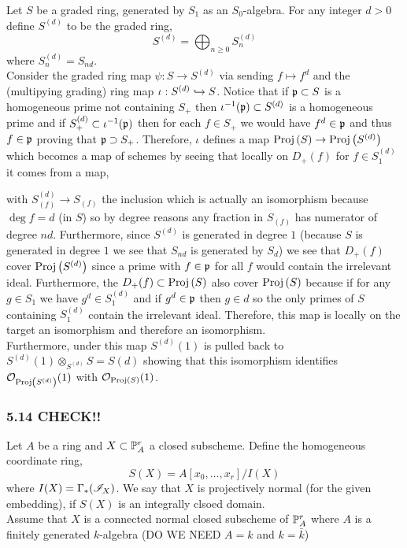 \documentclass[12pt]{article}
\begin{document}
Let $S$ be a graded ring, generated by $S_1$ as an $S_0$-algebra. For any integer $d > 0$ define $S^{(d)}$ to be the graded ring,
\[ S^{(d)} = \bigoplus_{n \ge 0} S^{(d)}_{n} \]
where $S^{(d)}_n = S_{nd}$. 
\bigskip\\
Consider the graded ring map $\psi : S \to S^{(d)}$ via sending $f \mapsto f^d$ and the (multipying grading) ring map $\iota : S^{(d)} \embed S$. Notice that if $\p \subset S$ is a homogeneous prime not containing $S_+$ then $\iota^{-1}(\p) \subset S^{(d)}$ is a homogeneous prime and if $S^{(d)}_+ \subset \iota^{-1}(\p)$ then for each $f \in S_+$ we would have $f^d \in \p$ and thus $f \in \p$ proving that $\p \supset S_+$. Therefore, $\iota$ defines a map $\Proj{S} \to \Proj{S^{(d)}}$ which becomes a map of schemes by seeing that locally on $D_+(f)$ for $f \in S^{(d)}_1$ it comes from a map,
\begin{center}
\end{center}
with $S^{(d)}_{(f)} \to S_{(f)}$ the inclusion which is actually an isomorphism because $\deg{f} = d$ (in $S$) so by degree reasons any fraction in $S_{(f)}$ has numerator of degree $n d$. Furthermore, since $S^{(d)}$ is generated in degree $1$ (because $S$ is generated in degree $1$ we see that $S_{nd}$ is generated by $S_d$) we see that $D_+(f)$ cover $\Proj{S^{(d)}}$ since a prime with $f \in \p$ for all $f$ would contain the irrelevant ideal. Furthermore, the $D_+(f) \subset \Proj{S}$ also cover $\Proj{S}$ because if for any $g \in S_1$ we have $g^d \in S^{(d)}_1$ and if $g^d \in \p$ then $g \in d$ so the only primes of $S$ containing $S^{(d)}_1$ contain the irrelevant ideal. Therefore, this map is locally on the target an isomorphism and therefore an isomorphism. 
\bigskip\\
Furthermore, under this map $S^{(d)}(1)$ is pulled back to $S^{(d)}(1) \otimes_{S^{(d)}} S = S(d)$ showing that this isomorphism identifies $\struct{\Proj{S^{(d)}}}(1)$ with $\struct{\Proj{S}}(1)$. 


\subsubsection{5.14 CHECK!!}

Let $A$ be a ring and $X \subset \P^r_A$ a closed subscheme. Define the homogeneous coordinate ring,
\[ S(X) = A[x_0, \dots, x_r]/I(X) \]
where $I(X) = \Gamma_*(\I_X)$. We say that $X$ is projectively normal (for the given embedding), if $S(X)$ is an integrally clsoed domain.
\bigskip\\
Assume that $X$ is a connected normal closed subscheme of $\P^r_A$ where $A$ is a finitely generated $k$-algebra (DO WE NEED $A = k$ and $k = \bar{k}$)
\end{document}
